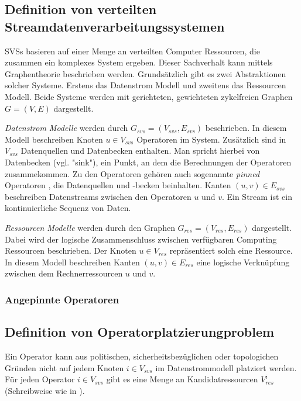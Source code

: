 \documentclass{article}
\begin{document}
\subsection{Definition von verteilten Streamdatenverarbeitungssystemen}  \label{SVS-Definition}  %
SVSs basieren auf einer Menge an verteilten Computer Ressourcen, die zusammen ein komplexes System ergeben. 
Dieser Sachverhalt kann mittels Graphentheorie beschrieben werden. Grundsätzlich gibt es zwei Abstraktionen solcher Systeme. 
Erstens das Datenstrom Modell und zweitens das Ressourcen Modell. 
Beide Systeme werden mit gerichteten, gewichteten zykelfreien Graphen $G = (V,E)$ dargestellt. 

\textit{Datenstrom Modelle} werden durch $G_{svs} = (V_{svs}, E_{svs})$ beschrieben. In diesem Modell beschreiben Knoten $u \in V_{svs}$ Operatoren im System. 
Zusätzlich sind in $V_{svs}$ Datenquellen und Datenbecken enthalten. Man spricht hierbei von Datenbecken (vgl. "sink"), ein Punkt, an dem die Berechnungen der Operatoren zusammekommen. 
Zu den Operatoren gehören auch sogenannte \textit{pinned} Operatoren \cite{k3}, 
die Datenquellen und -becken beinhalten. Kanten $(u,v) \in E_{svs}$ beschreiben Datenstreams 
zwischen den Operatoren $u$ und $v$.  Ein Stream ist ein kontinuierliche Sequenz von Daten. 

\textit{Ressourcen Modelle} werden durch den Graphen $G_{res} = (V_{res}, E_{res})$ dargestellt. 
Dabei wird der logische Zusammenschluss zwischen verfügbaren Computing Ressourcen beschrieben. Der Knoten $u \in V_{res}$ 
repräsentiert solch eine Ressource. In diesem Modell beschreiben Kanten $(u,v) \in E_{res}$ 
eine logische Verknüpfung zwischen dem Rechnerressourcen $u$ und $v$.

\subsubsection{Angepinnte Operatoren}

\subsection{Definition von Operatorplatzierungproblem} \label{OPP-Definition}
Ein Operator kann aus politischen, sicherheitsbezüglichen oder topologichen Gründen \cite{cardellini-optimal_operatorplc} nicht auf jedem Knoten 
$i \in V_{svs}$ im Datenstrommodell platziert werden. 
Für jeden Operator $i \in V_{svs}$ gibt es eine Menge an Kandidatressourcen $V_{res}^i$ (Schreibweise wie in \cite{k3}).
\end{document}
